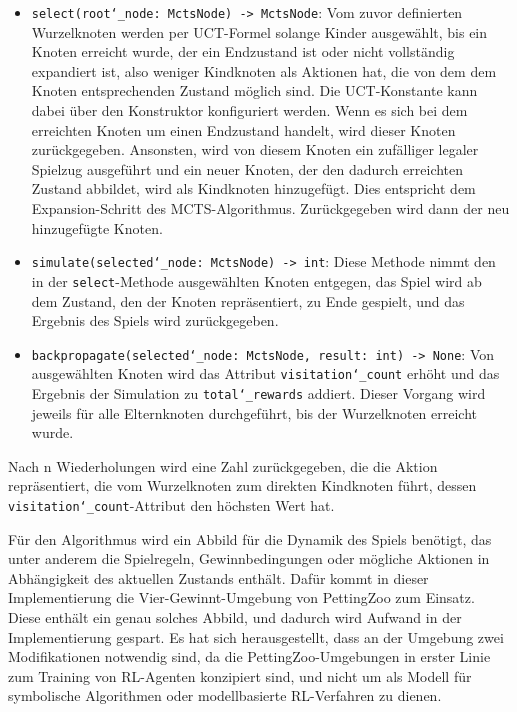 \begin{itemize}
\item \texttt{select(root\char`_node: MctsNode) -> MctsNode}: Vom zuvor definierten Wurzelknoten werden per UCT-Formel solange Kinder ausgewählt, bis ein Knoten erreicht wurde, der ein Endzustand ist oder nicht vollständig expandiert ist, also weniger Kindknoten als Aktionen hat, die von dem dem Knoten entsprechenden Zustand möglich sind. Die UCT-Konstante kann dabei über den Konstruktor konfiguriert werden. Wenn es sich bei dem erreichten Knoten um einen Endzustand handelt, wird dieser Knoten zurückgegeben. Ansonsten, wird von diesem Knoten ein zufälliger legaler Spielzug ausgeführt und ein neuer Knoten, der den dadurch erreichten Zustand abbildet, wird als Kindknoten hinzugefügt. Dies entspricht dem Expansion-Schritt des MCTS-Algorithmus. Zurückgegeben wird dann der neu hinzugefügte Knoten.
\item \texttt{simulate(selected\char`_node: MctsNode) -> int}: Diese Methode nimmt den in der \texttt{select}-Methode ausgewählten Knoten entgegen, das Spiel wird ab dem Zustand, den der Knoten repräsentiert, zu Ende gespielt, und das Ergebnis des Spiels wird zurückgegeben.
\item \texttt{backpropagate(selected\char`_node: MctsNode, result: int) -> None}: Von ausgewählten Knoten wird das Attribut \texttt{visitation\char`_count} erhöht und das Ergebnis der Simulation zu \texttt{total\char`_rewards} addiert. Dieser Vorgang wird jeweils für alle Elternknoten durchgeführt, bis der Wurzelknoten erreicht wurde.
\end{itemize}

Nach n Wiederholungen wird eine Zahl zurückgegeben, die die Aktion repräsentiert, die vom Wurzelknoten zum direkten Kindknoten führt, dessen \texttt{visitation\char`_count}-Attribut den höchsten Wert hat.


Für den Algorithmus wird ein Abbild für die Dynamik des Spiels benötigt, das unter anderem die Spielregeln, Gewinnbedingungen oder mögliche Aktionen in Abhängigkeit des aktuellen Zustands enthält. Dafür kommt in dieser Implementierung die Vier-Gewinnt-Umgebung von PettingZoo zum Einsatz. Diese enthält ein genau solches Abbild, und dadurch wird Aufwand in der Implementierung gespart. Es hat sich herausgestellt, dass an der Umgebung zwei Modifikationen notwendig sind, da die PettingZoo-Umgebungen in erster Linie zum Training von RL-Agenten konzipiert sind, und nicht um als Modell für symbolische Algorithmen oder modellbasierte RL-Verfahren zu dienen.

